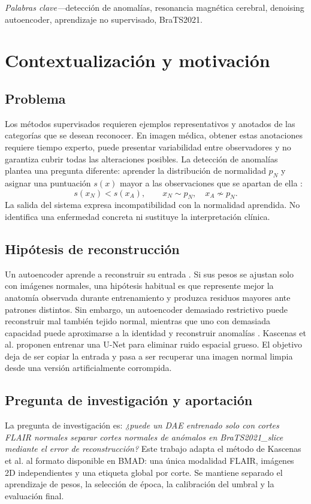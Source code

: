 \documentclass[10pt,a4paper,twocolumn]{article}
\begin{document}
\smallskip
\noindent\textit{Palabras clave---}detección de anomalías, resonancia magnética
cerebral, denoising autoencoder, aprendizaje no supervisado, BraTS2021.
\endgroup

\section{Contextualización y motivación}

\subsection{Problema}
Los métodos supervisados requieren ejemplos representativos y anotados de las
categorías que se desean reconocer. En imagen médica, obtener estas anotaciones
requiere tiempo experto, puede presentar variabilidad entre observadores y no
garantiza cubrir todas las alteraciones posibles. La detección de anomalías
plantea una pregunta diferente: aprender la distribución de normalidad $p_N$ y
asignar una puntuación $s(x)$ mayor a las observaciones que se apartan de ella
\cite{pang2021review,ruff2021unifying}:
\[
 s(x_N)<s(x_A),\qquad x_N\sim p_N,\quad x_A\not\sim p_N.
\]
La salida del sistema expresa incompatibilidad con la normalidad aprendida. No
identifica una enfermedad concreta ni sustituye la interpretación clínica.

\subsection{Hipótesis de reconstrucción}
Un autoencoder aprende a reconstruir su entrada \cite{hinton2006reducing}. Si
sus pesos se ajustan solo con imágenes normales, una hipótesis habitual es que
represente mejor la anatomía observada durante entrenamiento y produzca residuos
mayores ante patrones distintos. Sin embargo, un autoencoder demasiado
restrictivo puede reconstruir mal también tejido normal, mientras que uno con
demasiada capacidad puede aproximarse a la identidad y reconstruir anomalías
\cite{baur2021autoencoders}. Kascenas et al. \cite{kascenas2022denoising}
proponen entrenar una U-Net para eliminar ruido espacial grueso. El objetivo deja
de ser copiar la entrada y pasa a ser recuperar una imagen normal limpia desde
una versión artificialmente corrompida.

\subsection{Pregunta de investigación y aportación}
La pregunta de investigación es: \emph{¿puede un DAE entrenado solo con cortes
FLAIR normales separar cortes normales de anómalos en
BraTS2021\_slice mediante el error de reconstrucción?} Este trabajo adapta el
método de Kascenas et al. al formato disponible en BMAD: una única modalidad
FLAIR, imágenes 2D independientes y una etiqueta global por corte. Se mantiene
separado el aprendizaje de pesos, la selección de época, la calibración del
umbral y la evaluación final.
\end{document}
